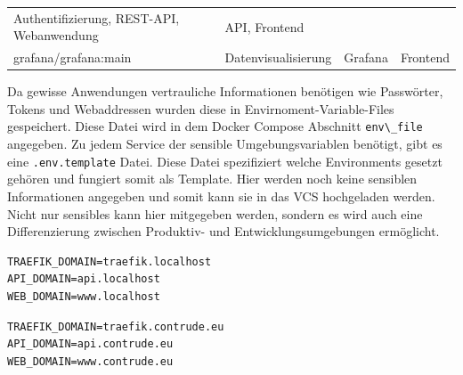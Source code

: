 \documentclass[
    headings=optiontotocandhead,%
    twoside,
    numbers=noenddot,%
    12pt, %
    titlepage, %
    parskip=full, %
    listof=leveldown, 
    numbers=noenddot, %
    a4paper,DIV=14,
    BCOR=15mm,
]{scrbook}
\newcommand{\passthrough}[1]{#1}
\begin{document}
\begin{longtable}[]{@{}llll@{}}
\begin{minipage}[t]{0.22\columnwidth}
Authentifizierung, REST-API, Webanwendung\strut
\end{minipage} & \begin{minipage}[t]{0.22\columnwidth}\raggedright
API, Frontend\strut
\end{minipage}\tabularnewline
\begin{minipage}[t]{0.22\columnwidth}\raggedright
grafana/grafana:main\strut
\end{minipage} & \begin{minipage}[t]{0.22\columnwidth}\raggedright
Datenvisualisierung\strut
\end{minipage} & \begin{minipage}[t]{0.22\columnwidth}\raggedright
Grafana\strut
\end{minipage} & \begin{minipage}[t]{0.22\columnwidth}\raggedright
Frontend\strut
\end{minipage}\tabularnewline
\bottomrule
\end{longtable}

Da gewisse Anwendungen vertrauliche Informationen benötigen wie
Passwörter, Tokens und Webaddressen wurden diese in
Envirnoment-Variable-Files gespeichert. Diese Datei wird in dem Docker
Compose Abschnitt \passthrough{\lstinline!env\_file!} angegeben. Zu
jedem Service der sensible Umgebungsvariablen benötigt, gibt es eine
\passthrough{\lstinline!.env.template!} Datei. Diese Datei spezifiziert
welche Environments gesetzt gehören und fungiert somit als Template.
Hier werden noch keine sensiblen Informationen angegeben und somit kann
sie in das VCS hochgeladen werden. Nicht nur sensibles kann hier
mitgegeben werden, sondern es wird auch eine Differenzierung zwischen
Produktiv- und Entwicklungsumgebungen ermöglicht.

\begin{lstlisting}[caption={Definition einer Entwicklungsumgebung mittels Umgebungsvariablen}]
TRAEFIK_DOMAIN=traefik.localhost
API_DOMAIN=api.localhost
WEB_DOMAIN=www.localhost
\end{lstlisting}

\begin{lstlisting}[caption={Definition einer Produktivumgebung mittels Umgebungsvariablen}]
TRAEFIK_DOMAIN=traefik.contrude.eu
API_DOMAIN=api.contrude.eu
WEB_DOMAIN=www.contrude.eu
\end{lstlisting}
\end{document}
